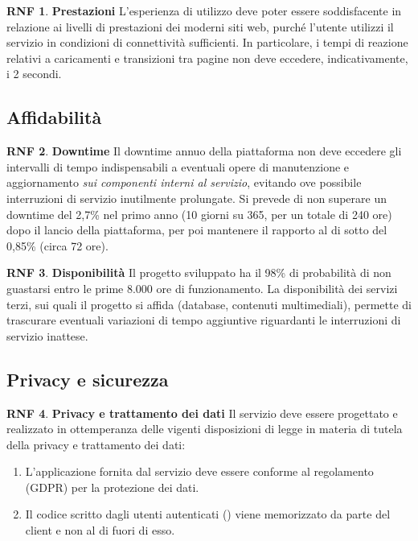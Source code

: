 \documentclass[11pt, a4paper]{article}
\theoremstyle{definition}
\newtheorem{nonfuncreq}{RNF} %
\begin{document}
\begin{nonfuncreq}
\textbf{Prestazioni }
L'esperienza di utilizzo deve poter essere soddisfacente in relazione
ai livelli di prestazioni dei moderni siti web, purché l'utente utilizzi
il servizio in condizioni di connettività sufficienti. In particolare,
i tempi di reazione relativi a caricamenti e transizioni tra pagine non
deve eccedere, indicativamente, i 2 secondi.
\end{nonfuncreq}

\subsection{Affidabilità}

\begin{nonfuncreq}
\label{downtime}
\textbf{Downtime }
Il downtime annuo della piattaforma non deve eccedere gli intervalli di
tempo indispensabili a eventuali opere di manutenzione e aggiornamento
\textit{sui componenti interni al servizio}, evitando ove possibile
interruzioni di servizio inutilmente prolungate. Si prevede di non superare
un downtime del 2,7\% nel primo anno (10 giorni su 365, per un totale di 240
ore) dopo il lancio della piattaforma, per poi mantenere il rapporto al di
sotto del 0,85\% (circa 72 ore).
\end{nonfuncreq}

\begin{nonfuncreq}
\textbf{Disponibilità }
\label{disponibilita}
Il progetto sviluppato ha il 98\% di probabilità di non guastarsi entro le
prime 8.000 ore di funzionamento. La disponibilità dei servizi terzi, sui
quali il progetto si affida (database, contenuti multimediali), permette di
trascurare eventuali variazioni di tempo aggiuntive riguardanti le
interruzioni di servizio inattese.
\end{nonfuncreq}

\subsection{Privacy e sicurezza}

\begin{nonfuncreq}
\textbf{Privacy e trattamento dei dati }
Il servizio deve essere progettato e realizzato in ottemperanza delle
vigenti disposizioni di legge in materia di tutela della privacy e
trattamento dei dati:
\begin{enumerate}
    \item L'applicazione fornita dal servizio deve essere conforme
    al regolamento \href{https://www.garanteprivacy.it/documents/10160/0/Regolamento+UE+2016+679.+Arricchito+con+riferimenti+ai+Considerando+Aggiornato+alle+rettifiche+pubblicate+sulla+Gazzetta+Ufficiale++dell%27Unione+europea+127+del+23+maggio+2018}{\textcolor{blue}{\underbar{UE n.2016/679}}}
    (GDPR) per la protezione dei dati.

    \item Il codice scritto dagli utenti autenticati (\textcolor{blue}{})
    viene memorizzato da parte del client e non al di fuori di esso.
\end{enumerate}
\end{nonfuncreq}
\end{document}
